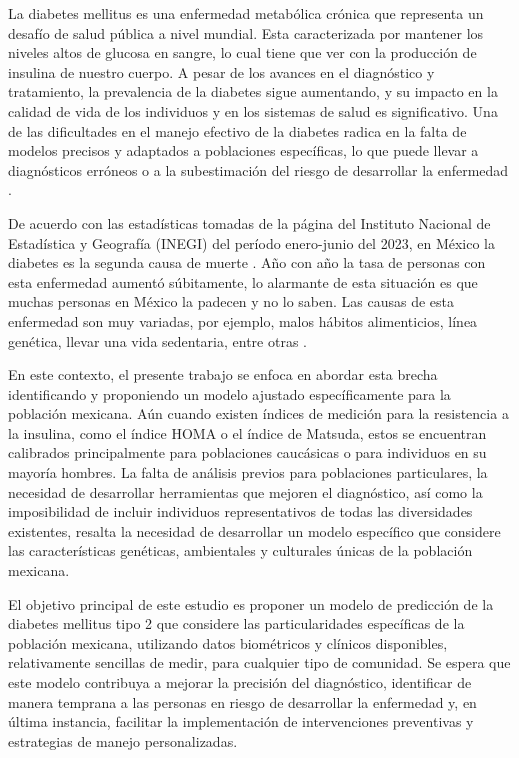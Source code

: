 

La diabetes mellitus es una enfermedad metabólica crónica que representa un desafío de salud pública a nivel mundial. Esta caracterizada por mantener los niveles altos de glucosa en sangre, lo cual tiene que ver con la producción de insulina de nuestro cuerpo. A pesar de los avances en el diagnóstico y tratamiento, la prevalencia de la diabetes sigue aumentando, y su impacto en la calidad de vida de los individuos y en los sistemas de salud es significativo. Una de las dificultades en el manejo efectivo de la diabetes radica en la falta de modelos precisos y adaptados a poblaciones específicas, lo que puede llevar a diagnósticos erróneos o a la subestimación del riesgo de desarrollar la enfermedad \cite{HOMAMex}.

De acuerdo con las estadísticas tomadas de la página del Instituto Nacional de Estadística y Geografía (INEGI) del período enero-junio del 2023, en México la diabetes es la segunda causa de muerte \cite{INEGI}. Año con año la tasa de personas con esta enfermedad aumentó súbitamente, lo alarmante de esta situación es que muchas personas en México la padecen y no lo saben. Las causas de esta enfermedad son muy variadas, por ejemplo, malos hábitos alimenticios, línea genética, llevar una vida sedentaria, entre otras \cite{PromoSaludMexico}.

En este contexto, el presente trabajo se enfoca en abordar esta brecha identificando y proponiendo un modelo ajustado específicamente para la población mexicana. Aún cuando existen índices de medición para la resistencia a la insulina, como el índice HOMA o el índice de Matsuda, estos se encuentran calibrados principalmente para poblaciones caucásicas o para individuos en su mayoría hombres. La falta de análisis previos para poblaciones particulares, la necesidad de desarrollar herramientas que mejoren el diagnóstico, así como la imposibilidad de incluir individuos representativos de todas las diversidades existentes, resalta la necesidad de desarrollar un modelo específico que considere las características genéticas, ambientales y culturales únicas de la población mexicana.

El objetivo principal de este estudio es proponer un modelo de predicción de la diabetes mellitus tipo 2 que considere las particularidades específicas de la población mexicana, utilizando datos biométricos y clínicos disponibles, relativamente sencillas de medir, para cualquier tipo de comunidad. Se espera que este modelo contribuya a mejorar la precisión del diagnóstico, identificar de manera temprana a las personas en riesgo de desarrollar la enfermedad y, en última instancia, facilitar la implementación de intervenciones preventivas y estrategias de manejo personalizadas.

